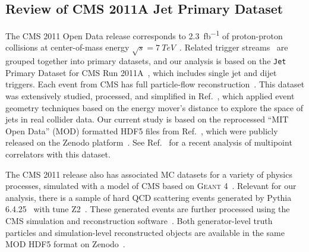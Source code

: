\documentclass[aps,prd,twocolumn,preprintnumbers,nofootinbib,longbibliography,floatfix]{revtex4-1}
\DeclareRobustCommand{\Ref}[1]{Ref.~\cite{#1}}
\newcommand{\Zenodo}{{\sc Zenodo}\xspace}
\newcommand{\Pythia}{{\sc Pythia}\xspace}
\newcommand{\Jet}{{\tt Jet}\xspace}
\begin{document}
\subsection{Review of CMS 2011A Jet Primary Dataset}
\label{sec:jetprimary}


The CMS 2011 Open Data release corresponds to \SI{2.3}{fb^{-1}} of proton-proton collisions at center-of-mass energy $\sqrt{s}=\SI{7}{TeV}$~\cite{CMS2011Release}.
%
Related trigger streams~\cite{Khachatryan:2016bia} are grouped together into primary datasets, and our analysis is based on the \Jet Primary Dataset for CMS Run 2011A~\cite{CMS:JetPrimary2011A}, which includes single jet and dijet triggers.
%
Each event from CMS has full particle-flow reconstruction~\cite{CMS-PAS-PFT-09-001,CMS-PAS-PFT-10-001,Sirunyan:2017ulk}.
%
This dataset was extensively studied, processed, and simplified in \Ref{Komiske:2019jim}, which applied event geometry techniques based on the energy mover's distance \cite{Komiske:2019fks} to explore the space of jets in real collider data.
%
Our current study is based on the reprocessed ``MIT Open Data'' (MOD) formatted HDF5 files from \Ref{Komiske:2019jim}, which were publicly released on the \Zenodo platform~\cite{MOD:ZenodoCMS}.
%
See \Ref{Komiske:2022enw} for a recent analysis of multipoint correlators with this dataset.


The CMS 2011 release also has associated MC datasets for a variety of physics processes, simulated with a model of CMS based on \textsc{Geant} 4~\cite{Agostinelli:2002hh}.
%
Relevant for our analysis, there is a sample of hard QCD scattering events generated by \Pythia 6.4.25~\cite{Sjostrand:2006za} with tune Z2~\cite{Field:2011iq}.
%
These generated events are further processed using the CMS simulation and reconstruction software~\cite{CMS:QCDsim170-300,CMS:QCDsim300-470,CMS:QCDsim470-600,CMS:QCDsim600-800,CMS:QCDsim800-1000,CMS:QCDsim1000-1400,CMS:QCDsim1400-1800,CMS:QCDsim1800}.
%
Both generator-level truth particles and simulation-level reconstructed objects are available in the same MOD HDF5 format on \Zenodo~\cite{MOD:ZenodoMC170,MOD:ZenodoMC300,MOD:ZenodoMC470,MOD:ZenodoMC600,MOD:ZenodoMC800,MOD:ZenodoMC1000,MOD:ZenodoMC1400,MOD:ZenodoMC1800}.
\end{document}
